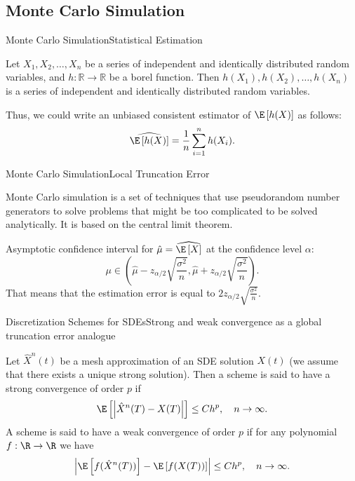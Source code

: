 \subsection{Monte Carlo Simulation}
    \begin{frame}{Monte Carlo Simulation}{Statistical Estimation}
        \begin{lemma}
            Let $X_1, X_2, \dots, X_n$ be a series of independent and identically distributed random variables, and $h: \mathbb{R} \to \mathbb{R}$ be a borel function. Then $h(X_1), h(X_2), \dots, h(X_n)$ is a series of independent and identically distributed random variables.
        \end{lemma}
        Thus, we could write an unbiased consistent estimator of $\E \left[h(X)\right]$ as follows:
        \begin{equation}
            \widehat{\E \left[h(X)\right]} = \frac{1}{n} \sum_{i=1}^n h(X_i).
        \end{equation}
    \end{frame}

    \begin{frame}{Monte Carlo Simulation}{Local Truncation Error}
        \begin{definition}
            Monte Carlo simulation is a set of techniques that use pseudorandom number generators to solve problems that might be too complicated to be solved analytically. It is based on the central limit theorem.
        \end{definition}
        Asymptotic confidence interval for $\hat{\mu} = \widehat{\E\left[X\right]}$ at the confidence level $\alpha$:
        \begin{equation}
            \mu \in \left(\hat{\mu} - z_{\alpha/2} \sqrt{\frac{\sigma^2}{n}}, \hat{\mu} + z_{\alpha/2} \sqrt{\frac{\sigma^2}{n}}\right).
        \end{equation}
        That means that the estimation error is equal to $2z_{\alpha/2} \sqrt{\frac{\sigma^2}{n}}$.
    \end{frame}

    \begin{frame}{Discretization Schemes for SDEs}{Strong and weak convergence as a global truncation error analogue}
        \begin{definition}
            Let $\hat X^n(t)$ be a mesh approximation of an SDE solution $X(t)$ (we assume that there exists a unique strong solution). 
            Then a scheme is said to have a strong convergence of order $p$ if 
            \begin{equation}
                \E\left[\left|\hat X^n(T) - X(T)\right|\right] \leq Ch^p, \quad n \to \infty.
            \end{equation}
            A scheme is said to have a weak convergence of order $p$ if for any polynomial $f: \R \to \R$ we have
            \begin{equation}
                \left|\E\left[f(\hat X^n(T))\right] - \E\left[f(X(T))\right]\right| \leq Ch^p, \quad n \to \infty.
            \end{equation}
        \end{definition}
    \end{frame}

